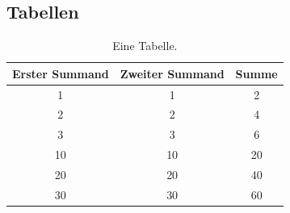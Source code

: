 \clearpage
\subsection{Tabellen}

\begin{table}[h]
	\centering
	\begin{tabular}{ccc}
		\toprule
		\textbf{Erster Summand}	& \textbf{Zweiter Summand} & \textbf{Summe} \\
		\midrule
		1 & 1 & 2 \\
		2 & 2 & 4 \\
		3 & 3 & 6 \\
		\midrule
		10 & 10 & 20 \\
		20 & 20 & 40 \\
		30 & 30 & 60 \\
		\bottomrule
	\end{tabular}
	\caption{Eine Tabelle.}
	\label{table:Summe}
\end{table}

